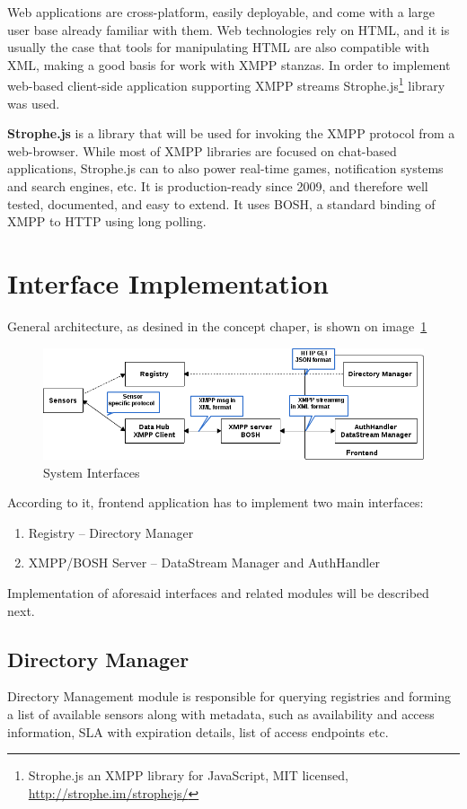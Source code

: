 Web applications are cross-platform, easily deployable, and come with a large user base already familiar with them. Web technologies rely on HTML, and it is usually the case that tools for manipulating HTML are also compatible with XML, making a good basis for work with XMPP stanzas. In order to implement web-based client-side application supporting XMPP streams Strophe.js\footnote{Strophe.js an XMPP library for JavaScript, MIT licensed, \url{http://strophe.im/strophejs/}} library was used.

\textbf{Strophe.js} is a library that will be used for invoking the XMPP protocol from a web-browser. While most of XMPP libraries are focused on chat-based applications, Strophe.js can to also power real-time games, notification systems and search engines, etc. It is production-ready since 2009, and therefore well tested, documented, and easy to extend. It uses BOSH, a standard binding of XMPP to HTTP using long polling.


\section{Interface Implementation}
	General architecture, as desined in the concept chaper, is shown on image~\ref{img:interfaces}
	\begin{figure}[!ht]
		\centering
		\includegraphics[scale=0.6]{images/XMPPflow.png}   
		\caption[System Interfaces]{System Interfaces}
        \label{img:interfaces}                      
		\end{figure}

	 According to it, frontend application has to implement two main interfaces:
	 \begin{enumerate}
	 \item Registry -- Directory Manager
	 \item XMPP/BOSH Server -- DataStream Manager and AuthHandler 
	 \end{enumerate}

	 Implementation of aforesaid interfaces and related modules will be described next.

\subsection{Directory Manager}
Directory Management module is responsible for querying registries and forming a list of available sensors along with metadata, such as availability and access information, SLA with expiration details, list of access endpoints etc.

